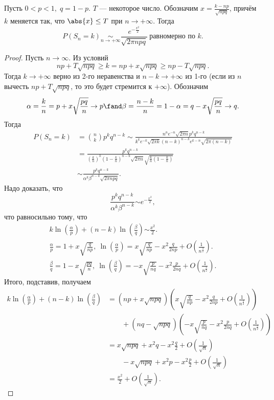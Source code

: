  \begin{theorem}
     Пусть $0 < p < 1,\; q = 1 - p$. $T$ --- некоторое число. Обозначим $x = \frac{k - np}{\sqrt{npq}}$, причём $k$ меняется так, что $\abs{x}\le T$ при $n \rightarrow +\infty$.
     Тогда 
     $$P(S_n = k) \underset{n\rightarrow +\infty}{\sim} \frac{e^{-\frac{x^2}{2}}}{\sqrt{2\pi npq}} \ \text{равномерно по $k$}.$$
 \end{theorem}

 \begin{proof}
    Пусть $n \to \infty$. Из условий
     $$np + T\sqrt{npq} \ge k = np + x\sqrt{npq} \ge np - T\sqrt{npq}.$$
     Тогда $ k\rightarrow +\infty$ верно из 2-го неравенства и $n - k \rightarrow +\infty$ из 1-го (если из $n$ вычесть $np + T\sqrt{npq}$,
     то это будет стремится к $+\infty$).
     Обозначим
     $$\alpha = \frac{k}{n} = p + x\sqrt{\frac{pq}{n}} \rightarrow p \fand \beta = \frac{n - k}{n} = 1 - \alpha = q - x\sqrt{\frac{pq}{n}} \rightarrow q.$$
    Тогда
    \begin{align*}
        P(S_n = k) &= \binom{n}{k}p^kq^{n- k} \sim \frac{n^ne^{-n}\sqrt{2\pi n}p^kq^{n - k}}{k^ke^{-k}\sqrt{2\pi k}(n - k)^{n - k}e^{k - n}\sqrt{2\pi(n - k)}} \\&=
         \frac{p^kq^{n - k}}{(\frac{k}{n})^k (1 - \frac{k}{n})^{n - k}\sqrt{2\pi n}\sqrt{\frac{k}{n}(1 - \frac{k}{n})}} \\&\sim
         \frac{p^kq^{n - k}}{\alpha^k\beta^{n - k}\sqrt{2\pi npq}}.
    \end{align*}
    Надо доказать, что
     $$\frac{p^kq^{n - k}}{\alpha^k\beta^{n - k}} \overset{}{\sim} e^{-\frac{x^2}{2}},$$
что равносильно тому, что
     \begin{gather*}
     k\ln\left(\frac{\alpha}{p}\right) + (n - k)\ln\left(\frac{\beta}{q}\right) \overset{}{\sim} \frac{x^2}{2}.\\
        \frac{\alpha}{p} = 1 + x\sqrt{\frac{q}{np}}, \  \ln\left(\frac{\alpha}{p}\right) = x\sqrt{\frac{q}{np}} - x^2 \frac{q}{2np}
         + O\left(\frac{1}{n^\frac{3}{2}}\right).\\
         \frac{\beta}{q} = 1 - x\sqrt{\frac{pq}{n}}, \  \ln\left(\frac{\beta}{q}\right) = -x\sqrt{\frac{p}{nq}} - x^2 \frac{p}{2nq}
         + O\left(\frac{1}{n^\frac{3}{2}}\right).
    \end{gather*}
     Итого, подставив, получаем
    \begin{align*}
        k\ln\left(\frac{\alpha}{p}\right) + (n - k)\ln\left(\frac{\beta}{q}\right) &= (np + x\sqrt{npq})\left(x\sqrt{\frac{q}{np}} - x^2 \frac{q}{2np}
         + O\left(\frac{1}{n^\frac{3}{2}}\right)\right) \\& \quad\quad + (nq - \sqrt{npq})\left(-x\sqrt{\frac{p}{nq}} - x^2 \frac{p}{2nq}
         + O\left(\frac{1}{n^\frac{3}{2}}\right)\right) \\&= x\sqrt{npq} + x^2q - x^2\frac{q}{2} + O\left(\frac{1}{\sqrt{n}}\right) \\& \quad\quad - x\sqrt{npq}
         +x^2p-x^2\frac{p}{2} + O\left(\frac{1}{\sqrt{n}}\right) \\&= \frac{x^2}{2} + O\left(\frac{1}{\sqrt{n}}\right).
    \end{align*}
   


\end{proof}
